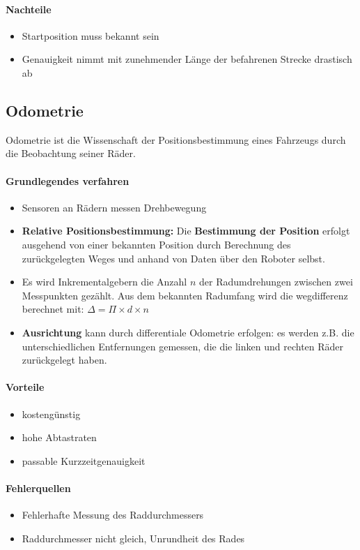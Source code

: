 \paragraph{Nachteile}
\begin{itemize}
	\item Startposition muss bekannt sein
	\item Genauigkeit nimmt mit zunehmender Länge der befahrenen Strecke
		drastisch ab
\end{itemize}

\subsection{Odometrie}
Odometrie ist die Wissenschaft der Positionsbestimmung eines Fahrzeugs durch
die Beobachtung seiner Räder.

\paragraph{Grundlegendes verfahren}
\begin{itemize}
	\item Sensoren an Rädern messen Drehbewegung
	\item \textbf{Relative Positionsbestimmung:} Die \textbf{Bestimmung der
		Position} erfolgt ausgehend von einer bekannten Position durch Berechnung
		des zurückgelegten Weges und anhand von Daten über den Roboter selbst.
	\item Es wird Inkrementalgebern die Anzahl $n$ der Radumdrehungen zwischen
		zwei Messpunkten gezählt. Aus dem bekannten Radumfang wird die
		wegdifferenz berechnet mit:
		\subitem $\Delta = \Pi \times d \times n $
	\item \textbf{Ausrichtung} kann durch differentiale Odometrie erfolgen: es
		werden z.B. die unterschiedlichen Entfernungen gemessen, die die linken
		und rechten Räder zurückgelegt haben.
\end{itemize}

\paragraph{Vorteile}
\begin{itemize}
	\item kostengünstig
	\item hohe Abtastraten
	\item passable Kurzzeitgenauigkeit
\end{itemize}

\paragraph{Fehlerquellen}
\begin{itemize}
	\item Fehlerhafte Messung des Raddurchmessers
	\item Raddurchmesser nicht gleich, Unrundheit des Rades
\end{itemize}


